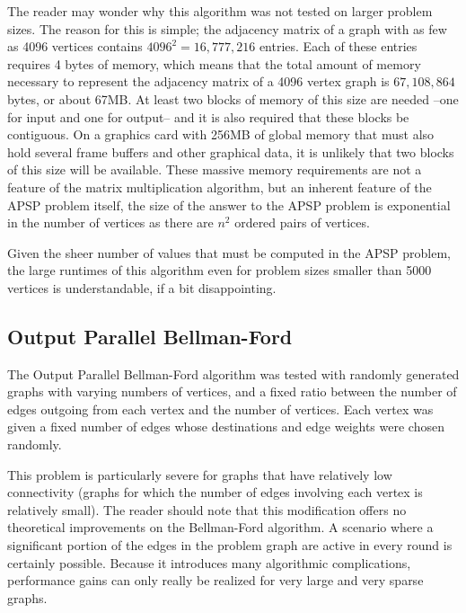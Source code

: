 \documentclass[12pt,twoside]{reedthesis}
\begin{document}
The reader may wonder why this algorithm was not tested on larger problem sizes. The reason for this is simple; the adjacency matrix of a graph with as few as 4096 vertices contains $4096^2 = 16,777,216$ entries. Each of these entries requires 4 bytes of memory, which means that the total amount of memory necessary to represent the adjacency matrix of a 4096 vertex graph is $67,108,864$ bytes, or about 67MB. At least two blocks of memory of this size are needed --one for input and one for output-- and it is also required that these blocks be contiguous. On a graphics card with 256MB of global memory that must also hold several frame buffers and other graphical data, it is unlikely that two blocks of this size will be available. These massive memory requirements are not a feature of the matrix multiplication algorithm, but an inherent feature of the APSP problem itself, the size of the answer to the APSP problem is exponential in the number of vertices as there are $n^2$ ordered pairs of vertices.

Given the sheer number of values that must be computed in the APSP problem, the large runtimes of this algorithm even for problem sizes smaller than 5000 vertices is understandable, if a bit disappointing.


\subsection{Output Parallel Bellman-Ford}

The Output Parallel Bellman-Ford algorithm was tested with randomly generated graphs with varying numbers of vertices, and a fixed ratio between the number of edges outgoing from each vertex and the number of vertices. Each vertex was given a fixed number of edges whose destinations and edge weights were chosen randomly.



This problem is particularly severe for graphs that have relatively low connectivity (graphs for which the number of edges involving each vertex is relatively small).
The reader should note that this modification offers no theoretical improvements on the Bellman-Ford algorithm. A scenario where a significant portion of the edges in the problem graph are active in every round is certainly possible. Because it introduces many algorithmic complications, performance gains can only really be realized for very large and very sparse graphs.

\end{document}
